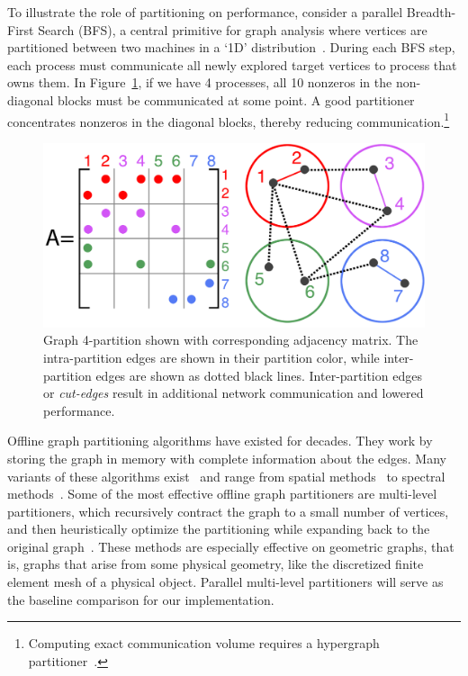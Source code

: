 To illustrate the role of partitioning on performance, consider a parallel Breadth-First Search (BFS), a central primitive for graph analysis where vertices are partitioned between two machines in a `1D' distribution~\cite{Buluc2D}. During each BFS step, each process must communicate all newly explored target vertices to process that owns them. In Figure~\ref{fig:0}, if we have 4 processes, all 10 nonzeros in the non-diagonal blocks must be communicated at some point. A good partitioner concentrates nonzeros in the diagonal blocks, thereby reducing communication.\footnote{Computing exact communication volume requires a hypergraph partitioner~\cite{hypergraph}.} 
\begin{figure}[h]
\centering
\includegraphics[width=0.85\columnwidth] {figures/graphpart1.pdf}
\caption[Caption for]{Graph 4-partition shown with corresponding adjacency matrix. The intra-partition edges are shown in their partition color, while inter-partition edges are shown as dotted black lines.  Inter-partition edges or \emph{cut-edges} result in additional network communication and lowered performance. }
\label{fig:0}
\end{figure}

Offline graph partitioning algorithms have existed for dec\-ades. They work by storing the graph in memory with complete information about the edges. Many variants of these algorithms exist~\cite{gpsurvey} and range from spatial methods~\cite{Gilbert95geometricmesh} to spectral methods~\cite{arora2009expander}. Some of the most effective offline graph partitioners are multi-level partitioners, which recursively contract the graph to a small number of vertices, and then heuristically optimize the partitioning while expanding back to the original graph~\cite{karypis1998multilevel}.
These methods are especially effective on geometric graphs, that is, graphs that arise from some physical geometry, like the discretized finite element mesh of a physical object.
Parallel multi-level partitioners will serve as the baseline comparison for our implementation. 

